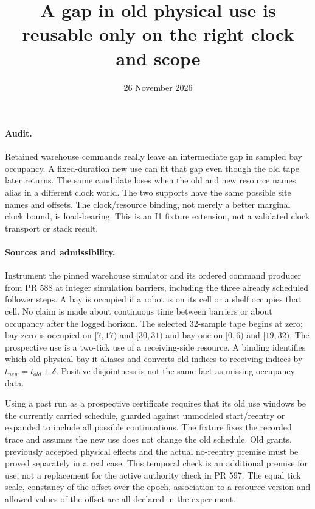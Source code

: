 \documentclass[11pt]{article}
\begin{document}
\title{A gap in old physical use is reusable only on the right clock and scope}
\author{}
\date{26 November 2026}
\maketitle

\paragraph{Audit.}
Retained warehouse commands really leave an intermediate gap in
sampled bay occupancy. A fixed-duration new use can fit that gap
even though the old tape later returns. The same candidate loses
when the old and new resource names alias in a different clock world.
The two supports have the same possible site names and offsets.
The clock/resource binding, not merely a better marginal clock bound,
is load-bearing. This is an I1 fixture extension, not a validated
clock transport or stack result.

\paragraph{Sources and admissibility.}
Instrument the pinned warehouse simulator and its ordered command
producer from PR 588 at integer simulation barriers, including the
three already scheduled follower steps. A bay is occupied if a
robot is on its cell or a shelf occupies that cell. No claim is made
about continuous time between barriers or about occupancy after
the logged horizon. The selected 32-sample tape begins at zero;
bay zero is occupied on $[7,17)$ and $[30,31)$ and bay one on
$[0,6)$ and $[19,32)$. The prospective use is a two-tick use of
a receiving-side resource. A binding identifies which old physical
bay it aliases and converts old indices to receiving indices by
$t_{new}=t_{old}+\delta$. Positive disjointness is not the same
fact as missing occupancy data.

Using a past run as a prospective certificate requires that its
old use windows be the currently carried schedule, guarded against
unmodeled start/reentry or expanded to include all possible continuations.
The fixture fixes the recorded trace and assumes the new use does
not change the old schedule. Old grants, previously accepted
physical effects and the actual no-reentry premise must be proved
separately in a real case. This temporal check is an additional
premise for use, not a replacement for the active authority check in
PR 597. The equal tick scale, constancy of the offset over the
epoch, association to a resource version and allowed values of
the offset are all declared in the experiment.
\end{document}
